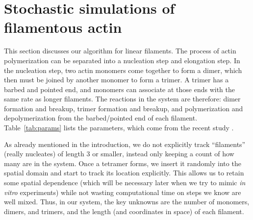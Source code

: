 \documentclass[11pt]{article}
\begin{document}
\section{Stochastic simulations of filamentous actin \label{sec:FilAct}}
This section discusses our algorithm for linear filaments. The process of actin polymerization can be separated into a nucleation step and elongation step. In the nucleation step, two actin monomers come together to form a dimer, which then must be joined by another monomer to form a trimer. A trimer has a barbed and pointed end, and monomers can associate at those ends with the same rate as longer filaments. The reactions in the system are therefore: dimer formation and breakup, trimer formation and breakup, and polymerization and depolymerization from the barbed/pointed end of each filament. Table\ \ref{tab:params} lists the parameters, which come from the recent study \cite{rosenbloom2021mechanism}.

As already mentioned in the introduction, we do not explicitly track ``filaments'' (really nucleates) of length 3 or smaller, instead only keeping a count of how many are in the system. Once a tetramer forms, we insert it randomly into the spatial domain and start to track its location explicitly. This allows us to retain some spatial dependence (which will be necessary later when we try to mimic \emph{in vitro} experiments) while not wasting computational time on steps we know are well mixed. Thus, in our system, the key unknowns are the number of monomers, dimers, and trimers, and the length (and coordinates in space) of each filament. 
\end{document}

